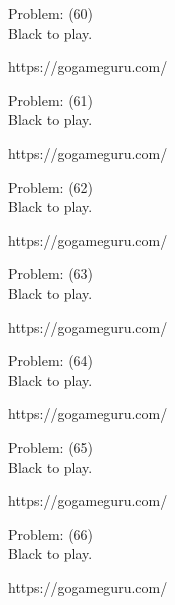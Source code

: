 \documentclass[11pt]{article}
\begin{document}
\begin{minipage}[t]{0.5\textwidth}
  {\centering
  
Problem: (60)\\
Black to play.

https://gogameguru.com/\\
  }
\end{minipage}
\begin{minipage}[t]{0.5\textwidth}
  {\centering
  
Problem: (61)\\
Black to play.

https://gogameguru.com/\\
  }
\end{minipage}
\begin{minipage}[t]{0.5\textwidth}
  {\centering
  
Problem: (62)\\
Black to play.

https://gogameguru.com/\\
  }
\end{minipage}
\begin{minipage}[t]{0.5\textwidth}
  {\centering
  
Problem: (63)\\
Black to play.

https://gogameguru.com/\\
  }
\end{minipage}
\begin{minipage}[t]{0.5\textwidth}
  {\centering
  
Problem: (64)\\
Black to play.

https://gogameguru.com/\\
  }
\end{minipage}
\begin{minipage}[t]{0.5\textwidth}
  {\centering
  
Problem: (65)\\
Black to play.

https://gogameguru.com/\\
  }
\end{minipage}
\begin{minipage}[t]{0.5\textwidth}
  {\centering
  
Problem: (66)\\
Black to play.

https://gogameguru.com/\\
  }
\end{minipage}
\end{document}
